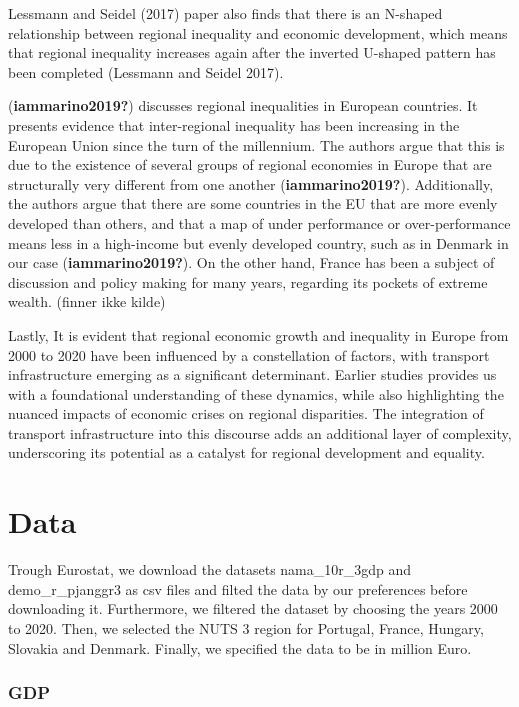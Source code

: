 \documentclass[
  a4paper,
  DIV=11,
  numbers=noendperiod]{scrartcl}
\begin{document}
Lessmann and Seidel (2017) paper also finds that there is an N-shaped
relationship between regional inequality and economic development, which
means that regional inequality increases again after the inverted
U-shaped pattern has been completed (Lessmann and Seidel 2017).

(\textbf{iammarino2019?}) discusses regional inequalities in European
countries. It presents evidence that inter-regional inequality has been
increasing in the European Union since the turn of the millennium. The
authors argue that this is due to the existence of several groups of
regional economies in Europe that are structurally very different from
one another (\textbf{iammarino2019?}). Additionally, the authors argue
that there are some countries in the EU that are more evenly developed
than others, and that a map of under performance or over-performance
means less in a high-income but evenly developed country, such as in
Denmark in our case (\textbf{iammarino2019?}). On the other hand, France
has been a subject of discussion and policy making for many years,
regarding its pockets of extreme wealth. (finner ikke kilde)

Lastly, It is evident that regional economic growth and inequality in
Europe from 2000 to 2020 have been influenced by a constellation of
factors, with transport infrastructure emerging as a significant
determinant. Earlier studies provides us with a foundational
understanding of these dynamics, while also highlighting the nuanced
impacts of economic crises on regional disparities. The integration of
transport infrastructure into this discourse adds an additional layer of
complexity, underscoring its potential as a catalyst for regional
development and equality.

\hypertarget{data}{%
\section{Data}\label{data}}

Trough Eurostat, we download the datasets nama\_10r\_3gdp and
demo\_r\_pjanggr3 as csv files and filted the data by our preferences
before downloading it. Furthermore, we filtered the dataset by choosing
the years 2000 to 2020. Then, we selected the NUTS 3 region for
Portugal, France, Hungary, Slovakia and Denmark. Finally, we specified
the data to be in million Euro.

\hypertarget{gdp}{%
\subsubsection{GDP}\label{gdp}}
\end{document}
